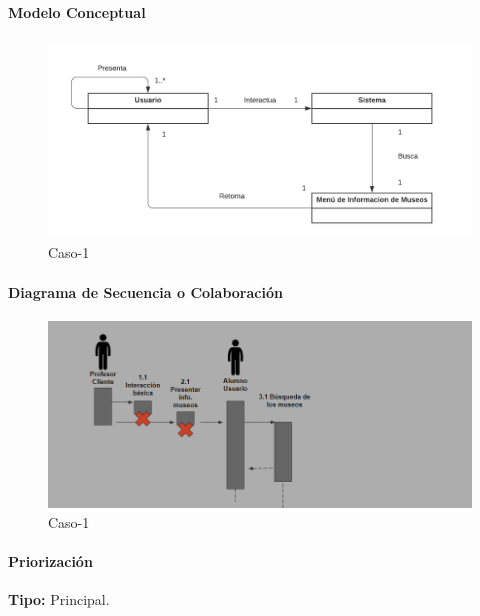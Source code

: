 \paragraph{Modelo Conceptual}

\begin{figure}[H]
\centerline{\includegraphics[width=15cm]{imgs/ModeloConceptualCaso_5_3.png}}
\caption{Caso-1}
\label{fig}
\end{figure}


\paragraph{Diagrama de Secuencia o Colaboración}

\begin{figure}[H]
\centerline{\includegraphics[width=15cm]{imgs/CasoUso_5_2.PNG}}
\caption{Caso-1}
\label{fig}
\end{figure}

\paragraph{Priorización}
{\textbf {Tipo:}}
Principal.
